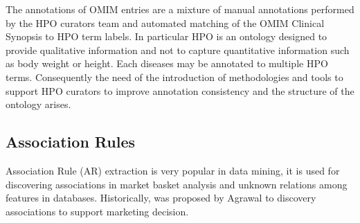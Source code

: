 \documentclass{article}
\theoremstyle{definition}
\begin{document}
The annotations of OMIM entries are a mixture of manual annotations performed by the HPO curators team and automated matching of the OMIM Clinical Synopsis to HPO term labels. In particular HPO is an ontology designed to provide qualitative information and not to capture quantitative information such as body weight or height. Each diseases may be annotated to multiple HPO terms. 
Consequently the need of the introduction of methodologies and tools to support HPO curators to improve annotation consistency and the structure of the ontology arises. %


\subsection{Association Rules}%

Association Rule (AR) extraction is very popular in data mining, it is used for discovering associations in market basket analysis and unknown relations among features in databases. Historically, was proposed by Agrawal \cite{citeulike:1005421} to discovery associations to support marketing decision. %
 
\end{document}

